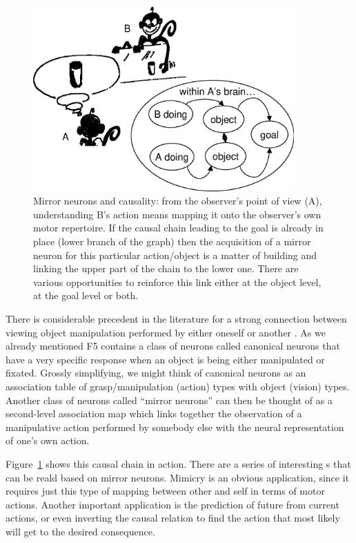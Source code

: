 \begin{figure}[tb]
\begin{center}
\includegraphics[width=10cm]{mirror-monkey.eps}
\caption{ 
\label{fig:mirror-monkey}
%
Mirror neurons and causality: from the observer's point
of view (A), understanding B's action means mapping it onto the
observer's own
motor repertoire. If the causal chain leading to the goal is already
in place (lower branch of the graph) then the acquisition of a
mirror neuron for this particular action/object is a matter of
building and linking the upper part of the chain to the lower one.
There are various opportunities to reinforce this link either at the object
level, at the goal level or both. 
%
}
\end{center}
\end{figure}


\ifverbose
There is considerable precedent in the literature for a strong
connection between viewing object manipulation performed by either
oneself or another \cite{wohlsclager02human}.  As we already mentioned
F5 contains a class of neurons called canonical neurons that have a
very specific response when an object is being either manipulated or
fixated.  Grossly simplifying, we might think of canonical neurons as
an association table of grasp/manipulation (action) types with object
(vision) types.  Another class of neurons called ``mirror neurons''
can then be thought of as a second-level association map which links
together the observation of a manipulative action performed by
somebody else with the neural representation of one's own action.
\fi

Figure~\ref{fig:mirror-monkey} shows this causal chain in action.
There are a series of interesting \ahhbehavior{}s that can be real\ize{}d based
on mirror neurons. Mimicry is an obvious application, since it
requires just this type of mapping between other and self in terms of
motor actions.  Another important application is the prediction of
future \ahhbehavior{} from current actions, or even inverting the causal
relation to find the action that most likely will get to the desired
consequence.

